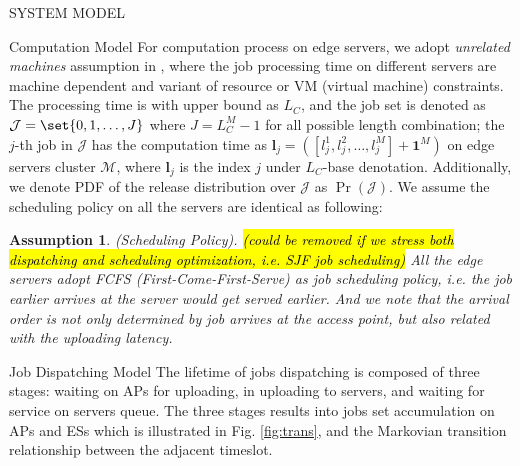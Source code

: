 \documentclass[10pt, conference, letterpaper]{IEEEtran}
\newtheorem{assumption}{Assumption}
\newcommand{\vecOne}{\mathbf{1}}
\renewcommand{\vec}{\mathbf}
\DeclarePairedDelimiter\set\{\}
\newcommand{\esSet}{\mathcal{M}}
\newcommand{\jSet}{\mathcal{J}}
\begin{document}
\begin{section}{SYSTEM MODEL}
        \begin{subsection}{Computation Model}
            For computation process on edge servers, we adopt \emph{unrelated machines} assumption in \cite{tan-online}, where the job processing time on different servers are machine dependent and variant of resource or VM (virtual machine) constraints. The processing time is with upper bound as $L_C$, and the job set is denoted as $\mathcal{J} = \set{0,1,\dots, J}$ where $J=L_C^M-1$ for all possible length combination; the $j$-th job in $\jSet$ has the computation time as $\vec{l}_j = ([l_j^1, l_j^2, \dots, l_j^M] + \vecOne^M)$ on edge servers cluster $\esSet$, where $\vec{l}_j$ is the index $j$ under $L_C$-base denotation. Additionally, we denote PDF of the release distribution over $\jSet$ as $\Pr(\jSet)$.
            We assume the scheduling policy on all the servers are identical as following:
            \begin{assumption}
                (Scheduling Policy).
                \hl{(could be removed if we stress both dispatching and scheduling optimization, i.e. SJF job scheduling)}
                All the edge servers adopt \emph{FCFS} (First-Come-First-Serve) as job scheduling policy, i.e. the job earlier arrives at the server would get served earlier. And we note that the arrival order is not only determined by job arrives at the access point, but also related with the uploading latency.
            \end{assumption}
        \end{subsection}

        \begin{subsection}{Job Dispatching Model}
            The lifetime of jobs dispatching is composed of three stages: waiting on APs for uploading, in uploading to servers, and waiting for service on servers queue. The three stages results into jobs set accumulation on APs and ESs which is illustrated in Fig. \ref{fig:trans}, and the Markovian transition relationship between the adjacent timeslot.


\end{subsection}
\end{section}
\end{document}
